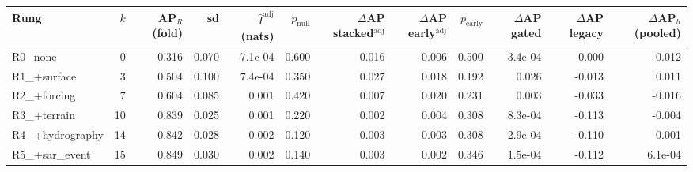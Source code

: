 \begin{tabular}{lrrrrrrrrrrr}
\toprule
Rung & $k$ & AP$_R$ (fold) & sd & $\hat I^{\mathrm{adj}}$ (nats) & $p_{\mathrm{null}}$ & $\Delta$AP stacked$^{\mathrm{adj}}$ & $\Delta$AP early$^{\mathrm{adj}}$ & $p_{\mathrm{early}}$ & $\Delta$AP gated & $\Delta$AP legacy & $\Delta$AP$_h$ (pooled) \\
\midrule
R0\_none & 0 & 0.316 & 0.070 & -7.1e-04 & 0.600 & 0.016 & -0.006 & 0.500 & 3.4e-04 & 0.000 & -0.012 \\
R1\_+surface & 3 & 0.504 & 0.100 & 7.4e-04 & 0.350 & 0.027 & 0.018 & 0.192 & 0.026 & -0.013 & 0.011 \\
R2\_+forcing & 7 & 0.604 & 0.085 & 0.001 & 0.420 & 0.007 & 0.020 & 0.231 & 0.003 & -0.033 & -0.016 \\
R3\_+terrain & 10 & 0.839 & 0.025 & 0.001 & 0.220 & 0.002 & 0.004 & 0.308 & 8.3e-04 & -0.113 & -0.004 \\
R4\_+hydrography & 14 & 0.842 & 0.028 & 0.002 & 0.120 & 0.003 & 0.003 & 0.308 & 2.9e-04 & -0.110 & 0.001 \\
R5\_+sar\_event & 15 & 0.849 & 0.030 & 0.002 & 0.140 & 0.003 & 0.002 & 0.346 & 1.5e-04 & -0.112 & 6.1e-04 \\
\bottomrule
\end{tabular}
